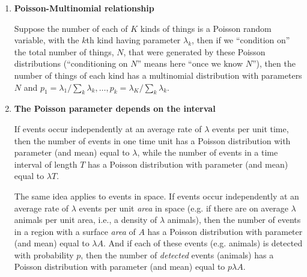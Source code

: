 \begin{enumerate}
\item \textbf{Poisson-Multinomial relationship}

Suppose the number of each of $K$ kinds of things is a Poisson random variable, with the $k$th kind having parameter $\lambda_k$, then if we ``condition on'' the total number of things, $N$, that were generated by these Poisson distributions (``conditioning on $N$'' means here ``once we know $N$''), then the number of things of each kind has a multinomial distribution with parameters $N$ and $p_1=\lambda_1/\sum_k\lambda_k,\ldots,p_k=\lambda_K/\sum_k\lambda_k$.

\item \textbf{The Poisson parameter depends on the interval}

If events occur independently at an average rate of $\lambda$ events per unit time, then the number of events in one time unit has a Poisson distribution with parameter (and mean) equal to $\lambda$, while the number of events in a time interval of length $T$ has a Poisson distribution with parameter (and mean) equal to $\lambda T$.

The same idea applies to events in space. If events occur independently at an average rate of $\lambda$ events per unit \textit{area} in space (e.g. if there are on average $\lambda$ animals per unit area, i.e., a density of $\lambda$ animals), then the number of events in a region with a surface \textit{area} of $A$ has a Poisson distribution with parameter (and mean) equal to $\lambda A$. And if each of these events (e.g. animals) is detected with probability $p$, then the number of \textit{detected} events (animals) has a Poisson distribution with parameter (and mean) equal to $p\lambda A$.


\end{enumerate}